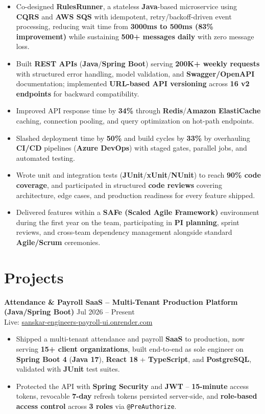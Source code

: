 \documentclass[a4paper,10pt]{article}
\begin{document}
\begin{itemize}[leftmargin=*]
    \item Co-designed \textbf{RulesRunner}, a stateless \textbf{Java}-based microservice using \textbf{CQRS} and \textbf{AWS SQS} with idempotent, retry/backoff-driven event processing, reducing wait time from \textbf{3000ms to 500ms (83\% improvement)} while sustaining \textbf{500+ messages daily} with zero message loss.
    \item Built \textbf{REST APIs} (\textbf{Java}/\textbf{Spring Boot}) serving \textbf{200K+ weekly requests} with structured error handling, model validation, and \textbf{Swagger/OpenAPI} documentation; implemented \textbf{URL-based API versioning} across \textbf{16 v2 endpoints} for backward compatibility.
    \item Improved API response time by \textbf{34\%} through \textbf{Redis}/\textbf{Amazon ElastiCache} caching, connection pooling, and query optimization on hot-path endpoints.
    \item Slashed deployment time by \textbf{50\%} and build cycles by \textbf{33\%} by overhauling \textbf{CI/CD} pipelines (\textbf{Azure DevOps}) with staged gates, parallel jobs, and automated testing.
    \item Wrote unit and integration tests (\textbf{JUnit}/\textbf{xUnit}/\textbf{NUnit}) to reach \textbf{90\% code coverage}, and participated in structured \textbf{code reviews} covering architecture, edge cases, and production readiness for every feature shipped.
    \item Delivered features within a \textbf{SAFe (Scaled Agile Framework)} environment during the first year on the team, participating in \textbf{PI planning}, sprint reviews, and cross-team dependency management alongside standard \textbf{Agile/Scrum} ceremonies.
\end{itemize}

\section*{Projects}

\textbf{Attendance \& Payroll SaaS -- Multi-Tenant Production Platform (Java/Spring Boot)} \hfill Jul 2026 -- Present \\
Live: \href{https://sanskar-engineers-payroll-ui.onrender.com/login}{sanskar-engineers-payroll-ui.onrender.com}
\begin{itemize}[leftmargin=*]
    \item Shipped a multi-tenant attendance and payroll \textbf{SaaS} to production, now serving \textbf{15+ client organizations}, built end-to-end as sole engineer on \textbf{Spring Boot 4} (\textbf{Java 17}), \textbf{React 18} + \textbf{TypeScript}, and \textbf{PostgreSQL}, validated with \textbf{JUnit} test suites.
    \item Protected the API with \textbf{Spring Security} and \textbf{JWT} -- \textbf{15-minute} access tokens, revocable \textbf{7-day} refresh tokens persisted server-side, and \textbf{role-based access control} across \textbf{3 roles} via \texttt{@PreAuthorize}.
\end{itemize}
\end{document}
